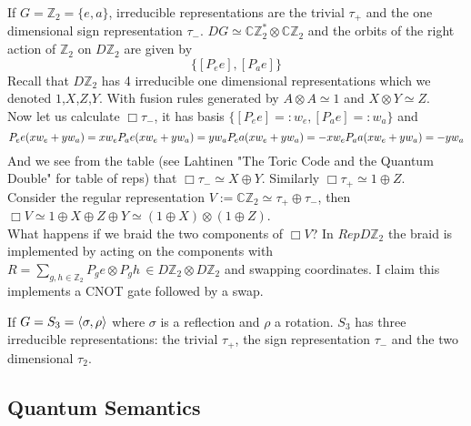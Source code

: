 \documentclass{article}
\newenvironment{example}[1][Example]{\begin{trivlist}
\item[\hskip \labelsep {\bfseries #1}]}{\end{trivlist}}
\begin{document}
\begin{example}
If $G=\mathbb{Z}_2= \{e,a\}$, irreducible representations are the trivial $\tau_+$ and the one dimensional sign representation $\tau_-$. $DG \simeq \mathbb{C}\mathbb{Z}_2^* \otimes \mathbb{C}\mathbb{Z}_2$ and the orbits of the right action of $\mathbb{Z}_2$ on $D\mathbb{Z}_2$ are given by
$$ \{ [P_ee], [P_ae] \}$$
Recall that $D\mathbb{Z}_2$ has 4 irreducible one dimensional representations which we denoted $1$,$X$,$Z$,$Y$. With fusion rules generated by $A \otimes A \simeq 1$ and $X \otimes Y \simeq Z$. \\
Now let us calculate $\Box \tau_-$, it has basis $\{[P_ee] =:w_e, [P_ae] =:w_a \}$ and 
\begin{equation*}
P_ee(xw_e + yw_a)= xw_e \\
P_ae(xw_e + yw_a)= yw_a \\
P_ea(xw_e + yw_a)= -xw_e \\ 
P_aa(xw_e + yw_a)= -yw_a
\end{equation*}
And we see from the table (see Lahtinen "The Toric Code and the Quantum Double" for table of reps) that $\Box \tau_- \simeq X \oplus Y$. Similarly $\Box \tau_+ \simeq 1 \oplus Z$. \\
Consider the regular representation $V := \mathbb{C}\mathbb{Z}_2 \simeq \tau_+ \oplus \tau_-$, then $\Box V \simeq 1 \oplus X \oplus Z \oplus Y \simeq (1 \oplus X) \otimes (1 \oplus Z) $.\\
What happens if we braid the two components of $\Box V$? In $RepD\mathbb{Z}_2$ the braid is implemented by acting on the components with $R=\sum_{g,h\in\mathbb{Z}_2} P_ge \otimes P_gh \, \in D\mathbb{Z}_2\otimes D\mathbb{Z}_2$ and swapping coordinates. I claim this implements a CNOT gate followed by a swap.
\end{example}

\begin{example}
If $G=S_3=\braket{\sigma,\rho}$ where $\sigma$ is a reflection and $\rho$ a rotation. $S_3$ has three irreducible representations: the trivial $\tau_+$, the sign representation $\tau_-$ and the two dimensional $\tau_2$.
\end{example}



\subsection{Quantum Semantics}




\end{document}
